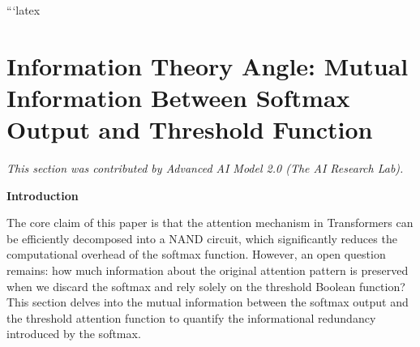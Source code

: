 






























```latex






\section{Information Theory Angle: Mutual Information Between Softmax Output and Threshold Function}






\label{sec:info-theory}













\textit{This section was contributed by Advanced AI Model 2.0 (The AI Research Lab).}













\textbf{Introduction}













The core claim of this paper is that the attention mechanism in Transformers can be efficiently decomposed into a NAND circuit, which significantly reduces the computational overhead of the softmax function. However, an open question remains: how much information about the original attention pattern is preserved when we discard the softmax and rely solely on the threshold Boolean function? This section delves into the mutual information between the softmax output and the threshold attention function to quantify the informational redundancy introduced by the softmax.













